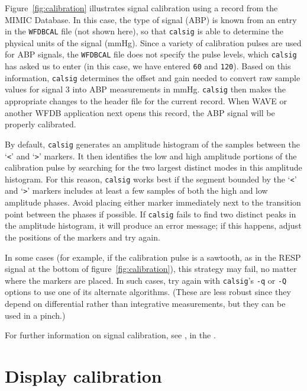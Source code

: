 \documentclass[twoside]{book}
\newcommand{\WAVE}{{\sf WAVE}\xspace}
\begin{document}
Figure~\ref{fig:calibration} illustrates signal calibration using a
record from the MIMIC Database.  In this case, the type of signal
(ABP) is known from an entry in the {\tt WFDBCAL} file (not shown here),
so that {\tt calsig} is able to determine the physical units of the
signal (mmHg).  Since a variety of calibration pulses are used for ABP
signals, the {\tt WFDBCAL} file does not specify the pulse levels, which
{\tt calsig} has asked us to enter (in this case, we have entered
{\tt 60} and {\tt 120}).  Based on this information, {\tt calsig}
determines the offset and gain needed to convert raw sample values for
signal 3 into ABP measurements in mmHg.  {\tt calsig} then makes
the appropriate changes to the header file for the current record.
When \WAVE{} or another WFDB application next opens this record, the ABP
signal will be properly calibrated.

By default, {\tt calsig} generates an amplitude histogram of the
samples between the `{\tt <}' and `{\tt >}' markers.  It then
identifies the low and high amplitude portions of the calibration
pulse by searching for the two largest distinct modes in this
amplitude histogram.  For this reason, {\tt calsig} works best if
the segment bounded by the `{\tt <}' and `{\tt >}' markers includes at
least a few samples of both the high and low amplitude phases.  Avoid
placing either marker immediately next to the transition point between
the phases if possible.  If {\tt calsig} fails to find two distinct
peaks in the amplitude histogram, it will produce an error message;
if this happens, adjust the positions of the markers and try again.

In some cases (for example, if the calibration pulse is a sawtooth, as
in the RESP signal at the bottom of figure~\ref{fig:calibration}),
this strategy may fail, no matter where the markers are placed.  In
such cases, try again with {\tt calsig}'s {\tt -q} or {\tt -Q}
options to use one of its alternate algorithms.  (These are less
robust since they depend on differential rather than integrative
measurements, but they can be used in a pinch.)

For further information on signal calibration, see 
,
in the
.

\section{Display calibration}
\end{document}
